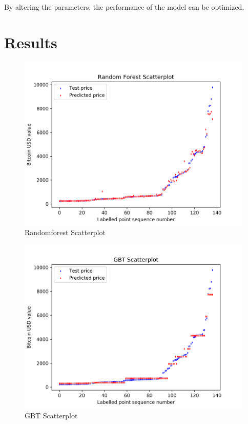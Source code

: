 \documentclass[sigconf]{acmart}
\begin{document}
By altering the parameters, the performance of the model can be optimized.

\section{Results}

\begin{figure}[!ht]
  \centering\includegraphics[width=\columnwidth]{PROJECT/images/RandomForestscatterplot.png}
  \caption{Randomforest Scatterplot}
  \label{scpl:ran}
\end{figure}

\begin{figure}[!ht]
  \centering\includegraphics[width=\columnwidth]{PROJECT/images/GBTscatterplot.png}
  \caption{GBT Scatterplot}
  \label{scpl:gbt}
\end{figure}
\end{document}
